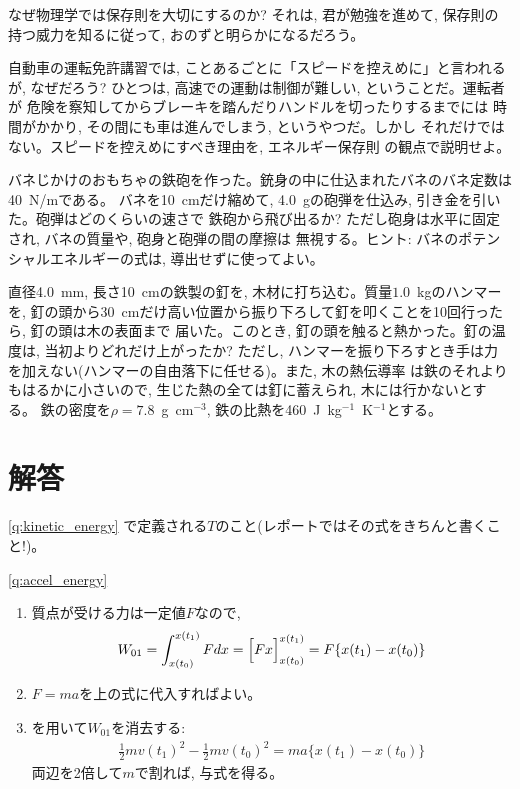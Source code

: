 なぜ物理学では保存則を大切にするのか? それは, 君が勉強を進めて, 保存則の
持つ威力を知るに従って, おのずと明らかになるだろう。\mv

\begin{q}\label{q:drive_speed} 自動車の運転免許講習では, 
ことあるごとに「スピードを控えめに」と言われるが, なぜだろう? 
ひとつは, 高速での運動は制御が難しい, ということだ。運転者が
危険を察知してからブレーキを踏んだりハンドルを切ったりするまでには
時間がかかり, その間にも車は進んでしまう, というやつだ。しかし
それだけではない。スピードを控えめにすべき理由を, エネルギー保存則
の観点で説明せよ。\end{q}
\hv

\begin{exq} バネじかけのおもちゃの鉄砲を作った。銃身の中に仕込まれたバネのバネ定数は40~N/mである。
バネを10~cmだけ縮めて, 4.0~gの砲弾を仕込み, 引き金を引いた。砲弾はどのくらいの速さで
鉄砲から飛び出るか? ただし砲身は水平に固定され, バネの質量や, 砲身と砲弾の間の摩擦は
無視する。ヒント: バネのポテンシャルエネルギーの式は, 導出せずに使ってよい。\end{exq}

\begin{exq} 直径4.0~mm, 長さ10~cmの鉄製の釘を, 木材に打ち込む。質量$1.0$~kgのハンマーを, 
釘の頭から30~cmだけ高い位置から振り下ろして釘を叩くことを10回行ったら, 釘の頭は木の表面まで
届いた。このとき, 釘の頭を触ると熱かった。釘の温度は, 当初よりどれだけ上がったか? ただし, 
ハンマーを振り下ろすとき手は力を加えない(ハンマーの自由落下に任せる)。また, 木の熱伝導率
は鉄のそれよりもはるかに小さいので, 生じた熱の全ては釘に蓄えられ, 木には行かないとする。
鉄の密度を$\rho=7.8$~g~cm$^{-3}$, 鉄の比熱を460~J~kg$^{-1}$~K$^{-1}$とする。\end{exq}

\section{解答}
\ref{q:kinetic_energy}
で定義される$T$のこと(レポートではその式をきちんと書くこと!)。
\vspace{0.4cm}

\ref{q:accel_energy}
\begin{enumerate}
\item 質点が受ける力は一定値$F$なので, 
\begin{eqnarray*}W_{01}=\int_{x(t_0)}^{x(t_1)}Fdx=\Bigl[Fx\Bigr]_{x(t_0)}^{x(t_1)}=F\{x(t_1)-x(t_0)\}\end{eqnarray*}
\item $F=ma$を上の式に代入すればよい。
\item {}を用いて$W_{01}$を消去する:
\begin{eqnarray*}
\frac{1}{2}mv(t_1)^2-\frac{1}{2}mv(t_0)^2=ma\{x(t_1)-x(t_0)\}
\end{eqnarray*}
両辺を2倍して$m$で割れば, 与式を得る。
\end{enumerate}
\vspace{0.4cm}

